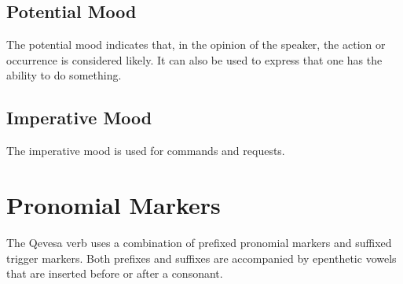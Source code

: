 \documentclass[grammar]{subfiles}
\begin{document}
\subsection{Potential Mood}
\label{ssec:vm_potential}

The potential mood indicates that, in the opinion of the speaker, the
action or occurrence is considered likely.  It can also be used to express that
one has the ability to do something.


\subsection{Imperative Mood}
\label{ssec:vm_imperative}

The imperative mood is used for commands and requests. 

\section{Pronomial Markers}
\label{sec:vm_pronomial_markers}

The Qevesa verb uses a combination of prefixed pronomial markers and suffixed
trigger markers. Both prefixes and suffixes are accompanied by epenthetic vowels
that are inserted before or after a consonant.
\end{document}
